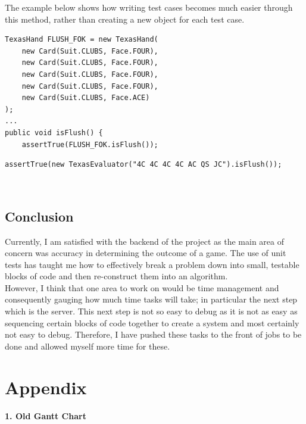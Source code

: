 \documentclass[11pt]{article}
\begin{document}
The example below shows how writing test cases becomes much easier through this method, rather than creating a new object for each test case.

\begin{minipage}{.5\textwidth}

\begin{lstlisting}
TexasHand FLUSH_FOK = new TexasHand(
    new Card(Suit.CLUBS, Face.FOUR),
    new Card(Suit.CLUBS, Face.FOUR),
    new Card(Suit.CLUBS, Face.FOUR),
    new Card(Suit.CLUBS, Face.FOUR),
    new Card(Suit.CLUBS, Face.ACE)
);
...
public void isFlush() {
    assertTrue(FLUSH_FOK.isFlush());
\end{lstlisting}
\end{minipage}
\begin{minipage}{.5\textwidth}

\begin{lstlisting}[breaklines=true]
assertTrue(new TexasEvaluator("4C 4C 4C 4C AC QS JC").isFlush());
\end{lstlisting}
\end{minipage} \\

\subsection*{Conclusion}

Currently, I am satisfied with the backend of the project as the main area of concern was accuracy in determining the outcome of a game. The use of unit tests has taught me how to effectively break a problem down into small, testable blocks of code and then re-construct them into an algorithm. \\


However, I think that one area to work on would be time management and consequently gauging how much time tasks will take; in particular the next step which is the server. This next step is not so easy to debug as it is not as easy as sequencing certain blocks of code together to create a system and most certainly not easy to debug. Therefore, I have pushed these tasks to the front of jobs to be done and allowed myself more time for these.

\newpage

\section{Appendix}

\textbf{1. Old Gantt Chart} \\
\end{document}
